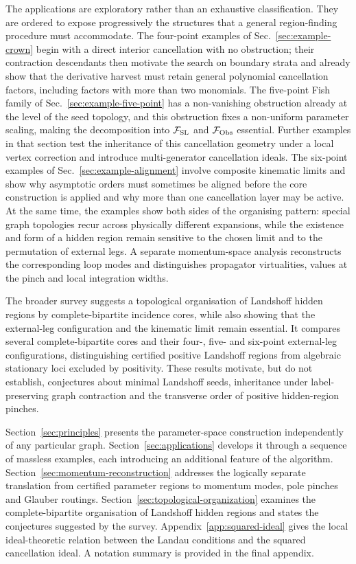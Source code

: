 \documentclass[a4paper,11pt]{article}
\begin{document}
The applications are exploratory rather than an exhaustive classification.
They are ordered to expose progressively the structures that a general
region-finding procedure must accommodate.  The four-point examples of
Sec.~\ref{sec:example-crown} begin with a direct interior cancellation with
no obstruction; their contraction descendants then motivate the search on
boundary strata and already show that the derivative harvest must retain
general polynomial cancellation factors, including factors with more than
two monomials.  The five-point Fish family of
Sec.~\ref{sec:example-five-point} has a non-vanishing obstruction already at
the level of the seed topology, and this obstruction fixes a non-uniform
parameter scaling, making the decomposition into \(\mathcal F_{\rm SL}\) and
\(\mathcal F_{\rm Obs}\) essential.  Further examples in that section test
the inheritance of this cancellation geometry under a local vertex correction
and introduce multi-generator cancellation ideals.  The six-point examples of
Sec.~\ref{sec:example-alignment} involve composite kinematic limits and show
why asymptotic orders must sometimes be aligned before the core construction
is applied and why more than one cancellation layer may be active.  At the
same time, the examples show both sides of the organising pattern: special graph
topologies recur across physically different expansions, while the existence
and form of a hidden region remain sensitive to the chosen limit and to the
permutation of external legs.  A separate momentum-space analysis reconstructs the
corresponding loop modes and distinguishes propagator virtualities, values at
the pinch and local integration widths.

The broader survey suggests a topological organisation of Landshoff hidden
regions by complete-bipartite incidence cores, while also showing that the
external-leg configuration and the kinematic limit remain essential.  It compares
several complete-bipartite cores and their four-, five- and six-point
external-leg configurations, distinguishing certified positive Landshoff regions from
algebraic stationary loci excluded by positivity.  These results motivate,
but do not establish, conjectures about minimal Landshoff seeds, inheritance
under label-preserving graph contraction and the transverse order of positive hidden-region
pinches.

Section~\ref{sec:principles} presents the parameter-space construction
independently of any particular graph.  Section~\ref{sec:applications}
develops it through a sequence of massless examples, each introducing an
additional feature of the algorithm.  Section~\ref{sec:momentum-reconstruction}
addresses the logically separate translation from certified parameter
regions to momentum modes, pole pinches and Glauber routings.
Section~\ref{sec:topological-organization} examines the complete-bipartite
organisation of Landshoff hidden regions and states the conjectures suggested
by the survey.  Appendix~\ref{app:squared-ideal} gives the local
ideal-theoretic relation between the Landau conditions and the squared
cancellation ideal.  A notation summary is provided in the final appendix.
\end{document}
